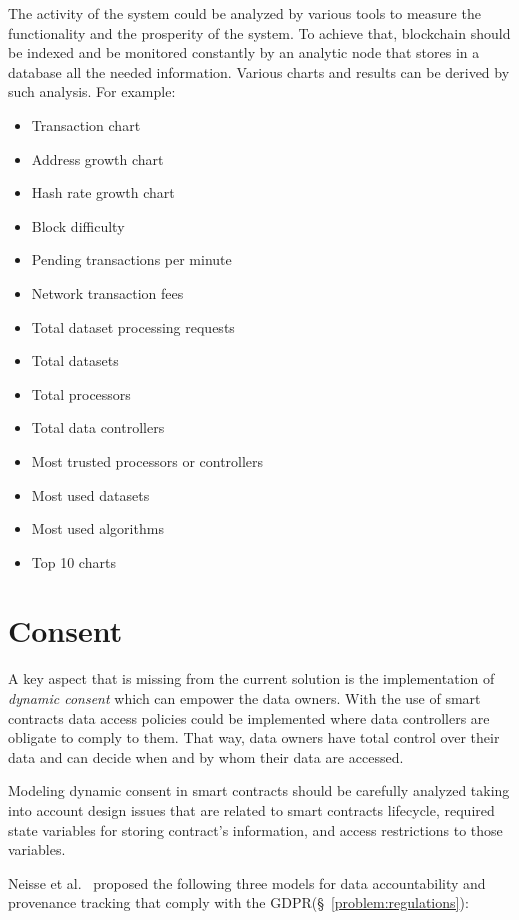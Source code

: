 The activity of the system could be analyzed by various tools to measure the functionality and the prosperity of the system. To achieve that, blockchain should be indexed and be monitored constantly by an analytic node that stores in a database all the needed information. Various charts and results can be derived by such analysis. For example:

\begin{itemize}
  \item Transaction chart
  \item Address growth chart
  \item Hash rate growth chart
  \item Block difficulty
  \item Pending transactions per minute
  \item Network transaction fees
  \item Total dataset processing requests
  \item Total datasets
  \item Total processors
  \item Total data controllers
  \item Most trusted processors or controllers
  \item Most used datasets
  \item Most used algorithms
  \item Top 10 charts
\end{itemize}

\section{Consent}
\label{future_work:consent}

A key aspect that is missing from the current solution is the implementation of \textit{dynamic consent} which can empower the data owners. With the use of smart contracts data access policies could be implemented where data controllers are obligate to comply to them. That way, data owners have total control over their data and can decide when and by whom their data are accessed.

Modeling dynamic consent in smart contracts should be carefully analyzed taking into account design issues that are related to smart contracts lifecycle, required state variables for storing contract’s information, and access restrictions to those variables.

Neisse et al.~\cite{DBLP:journals/corr/NeisseSF17} proposed the following three models for data accountability and provenance tracking that comply with the GDPR(§~\ref{problem:regulations}):

